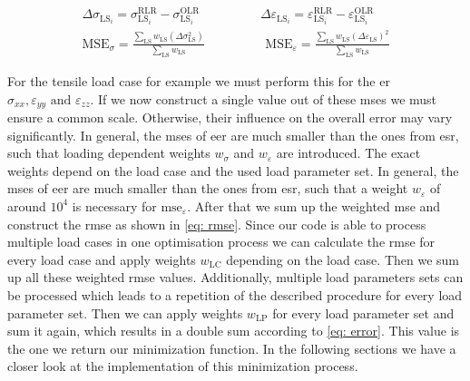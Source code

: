 \begin{gather}
    \label{eq: EMDifference}
    \Delta\sigma_{\scriptscriptstyle\text{LS}_i} = \sigma_{\scriptscriptstyle\text{LS}_i}^{\scriptscriptstyle\text{RLR}} - \sigma_{\scriptscriptstyle\text{LS}_i}^{\scriptscriptstyle\text{OLR}} \hspace{2cm}
    \Delta\varepsilon_{\scriptscriptstyle\text{LS}_i} = \varepsilon_{\scriptscriptstyle\text{LS}_i}^{\scriptscriptstyle\text{RLR}} - \varepsilon_{\scriptscriptstyle\text{LS}_i}^{\scriptscriptstyle\text{OLR}}\\
    \label{eq: mse}
    \text{MSE}_{\sigma} = \frac{\displaystyle\sum_{\text{LS}} w_{\scriptscriptstyle\text{LS}} (\Delta\sigma_{\scriptscriptstyle\text{LS}}^2)}{\displaystyle\sum_{\text{LS}}w_{\scriptscriptstyle\text{LS}} } \hspace{2cm}
    \text{MSE}_{\varepsilon} = \frac{\displaystyle\sum_{\text{LS}} w_{\scriptscriptstyle\text{LS}} (\Delta\varepsilon_{\scriptscriptstyle\text{LS}})^2}{\displaystyle\sum_{\text{LS}}w_{\scriptscriptstyle\text{LS}}}
\end{gather}



For the tensile load case for example we must perform this for the \acrlong{er} $\sigma_{xx}, \varepsilon_{yy} \text{ and } \varepsilon_{zz}$. 
If we now construct a single value out of these \acrshort{mse}s we must ensure a common scale. Otherwise, their influence on the overall error may vary significantly. In general, the \acrshort{mse}s of \acrlong{eer} are much smaller than the ones from \acrlong{esr}, such that loading dependent weights $w_{\sigma}$ and $w_{\varepsilon}$ are introduced. The exact weights depend on the load case and the used load parameter set. In general, the \acrshort{mse}s of \acrlong{eer} are much smaller than the ones from \acrlong{esr}, such that a weight $w_{\varepsilon}$ of around $10^4$ is necessary for $\text{mse}_{\varepsilon}$. After that we sum up the weighted \acrshort{mse} and construct the \acrshort{rmse} as shown in \autoref{eq: rmse}. Since our code is able to process multiple load cases in one optimisation process we can calculate the \acrshort{rmse} for every load case and apply weights $w_{\scriptscriptstyle\text{LC}}$ depending on the load case. Then we sum up all these weighted \acrshort{rmse} values. Additionally, multiple load parameters sets can be processed which leads to a repetition of the described procedure for every load parameter set. Then we can apply weights $w_{\scriptscriptstyle\text{LP}}$ for every load parameter set and sum it again, which results in a double sum according to \autoref{eq: error}. This value is the one we return our minimization function. In the following sections we have a closer look at the implementation of this minimization process. 

